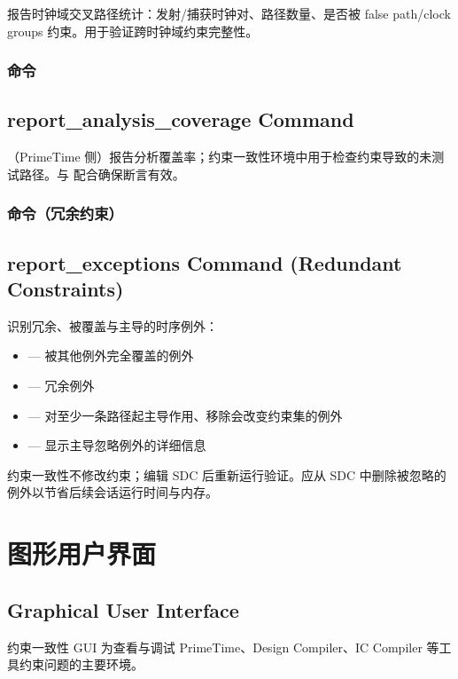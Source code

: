 报告时钟域交叉路径统计：发射/捕获时钟对、路径数量、是否被 false path/clock groups 约束。用于验证跨时钟域约束完整性。

\subsubsection{ 命令}
\subsection*{report\_analysis\_coverage Command}

（PrimeTime 侧）报告分析覆盖率；约束一致性环境中用于检查约束导致的未测试路径。与  配合确保断言有效。

\subsubsection{ 命令（冗余约束）}
\subsection*{report\_exceptions Command (Redundant Constraints)}

识别冗余、被覆盖与主导的时序例外：
\begin{itemize}
  \item {} — 被其他例外完全覆盖的例外
  \item {} — 冗余例外
  \item {} — 对至少一条路径起主导作用、移除会改变约束集的例外
  \item {} — 显示主导忽略例外的详细信息
\end{itemize}

约束一致性不修改约束；编辑 SDC 后重新运行验证。应从 SDC 中删除被忽略的例外以节省后续会话运行时间与内存。

\section{图形用户界面}
\subsection*{Graphical User Interface}

约束一致性 GUI 为查看与调试 PrimeTime、Design Compiler、IC Compiler 等工具约束问题的主要环境。

